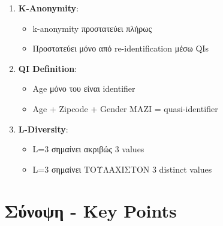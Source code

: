 \begin{warningbox}
\begin{enumerate}
    \item \textbf{K-Anonymity}:
    \begin{itemize}
        \item[$\times$] k-anonymity προστατεύει πλήρως
        \item[\checkmark] Προστατεύει μόνο από re-identification μέσω QIs
    \end{itemize}

    \item \textbf{QI Definition}:
    \begin{itemize}
        \item[$\times$] Age μόνο του είναι identifier
        \item[\checkmark] Age + Zipcode + Gender ΜΑΖΙ = quasi-identifier
    \end{itemize}

    \item \textbf{L-Diversity}:
    \begin{itemize}
        \item[$\times$] L=3 σημαίνει ακριβώς 3 values
        \item[\checkmark] L=3 σημαίνει ΤΟΥΛΑΧΙΣΤΟΝ 3 distinct values
    \end{itemize}
\end{enumerate}
\end{warningbox}

\section{Σύνοψη - Key Points}

